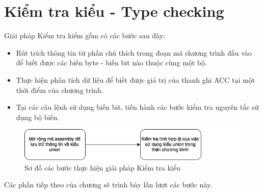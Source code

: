 \chapter{Kiểm tra kiểu - Type checking}
\label{chap:typechecking}
Giải pháp Kiểm tra kiểm gồm có các bước sau đây:
\begin{itemize}
\item Rút trích thông tin từ phần chú thích trong đoạn mã chương trình đầu vào để biết được các biến byte - biến bit nào thuộc cùng một bộ.
\item Thực hiện phân tích dữ liệu để biết được giá trị của thanh ghi ACC tại một thời điểm của chương trình.
\item Tại các câu lệnh sử dụng biến bit, tiến hành các bước kiểm tra nguyên tắc sử dụng bộ biến.
\end{itemize}
\begin{figure}
	\centering
	\includegraphics[width=0.7\linewidth]{image/soDoTypeChecking}
	\caption{Sơ đồ các bước thực hiện giải pháp Kiểm tra kiểu}
	\label{fig:sodotypechecking}
\end{figure}

Các phần tiếp theo của chương sẽ trình bày lần lượt các bước này.

